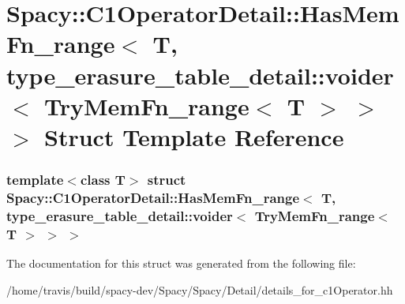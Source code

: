 \hypertarget{structSpacy_1_1C1OperatorDetail_1_1HasMemFn__range_3_01T_00_01type__erasure__table__detail_1_1vo5a2f55c65ea7b0b8b5147b132eac0fcd}{\section{\-Spacy\-:\-:\-C1\-Operator\-Detail\-:\-:\-Has\-Mem\-Fn\-\_\-range$<$ \-T, type\-\_\-erasure\-\_\-table\-\_\-detail\-:\-:voider$<$ \-Try\-Mem\-Fn\-\_\-range$<$ \-T $>$ $>$ $>$ \-Struct \-Template \-Reference}
\label{structSpacy_1_1C1OperatorDetail_1_1HasMemFn__range_3_01T_00_01type__erasure__table__detail_1_1vo5a2f55c65ea7b0b8b5147b132eac0fcd}
}
\subsubsection*{template$<$class T$>$ struct Spacy\-::\-C1\-Operator\-Detail\-::\-Has\-Mem\-Fn\-\_\-range$<$ T, type\-\_\-erasure\-\_\-table\-\_\-detail\-::voider$<$ Try\-Mem\-Fn\-\_\-range$<$ T $>$ $>$ $>$}



\-The documentation for this struct was generated from the following file\-:\begin{DoxyCompactItemize}
\item 
/home/travis/build/spacy-\/dev/\-Spacy/\-Spacy/\-Detail/details\-\_\-for\-\_\-c1\-Operator.\-hh\end{DoxyCompactItemize}
